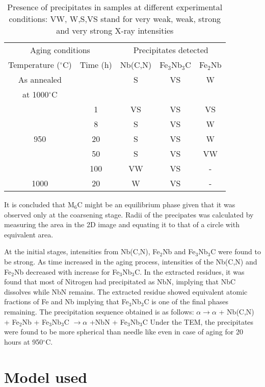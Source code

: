 \documentclass[12pt]{article}
\begin{document}
\begin{table}
\centering
\hspace*{-5em}
\caption{Presence of precipitates in samples at different experimental conditions: VW, W,S,VS stand for very weak, weak, strong and very strong X-ray intensities}
\hspace*{-5em}
\begin{tabular}{ c c c c c }
\hline
\multicolumn{2}{c}{Aging conditions} &  \multicolumn{3}{c}{Precipitates detected}\\
Temperature ($^\circ$C) & Time (h) & Nb(C,N) & Fe$_3$Nb$_3$C & Fe$_2$Nb \\ \hline
As annealed &  & S & VS & W \\
at 1000$^\circ$C & & & & \\ 
 & 1 & VS & VS & VS \\
 & 8 & S & VS & W \\
950 & 20 & S & VS & W \\
 & 50 & S & VS & VW \\
 & 100 & VW & VS & - \\
1000 & 20 & W & VS & - \\ \hline
\end{tabular}
\label{tab:prec}
\end{table}
It is concluded that M$_6$C might be an equilibrium phase given that it was observed only at the coarsening stage. Radii of the precipates was calculated by measuring the area in the 2D image and equating it to that of a circle with equivalent area.

 At the initial stages, intensities from Nb(C,N), Fe$_2$Nb and Fe$_3$Nb$_3$C were found to be strong. As time increased in the aging process, intensities of the Nb(C,N) and Fe$_2$Nb decreased with increase for Fe$_3$Nb$_3$C. In the extracted residues, it was found that most of Nitrogen had precipitated as NbN, implying that NbC dissolves while NbN remains. The extracted residue showed equivalent atomic fractions of Fe and Nb implying that Fe$_3$Nb$_3$C is one of the final phases remaining. The precipitation sequence obtained is as follows:
\newline
$\alpha \rightarrow \alpha$ + Nb(C,N) + Fe$_2$Nb + Fe$_3$Nb$_3$C $\rightarrow \alpha$ +NbN + Fe$_3$Nb$_3$C
Under the TEM, the precipitates were found to be more spherical than needle like even in case of aging for 20 hours at 950$^\circ$C.

\section{Model used}
\end{document}
